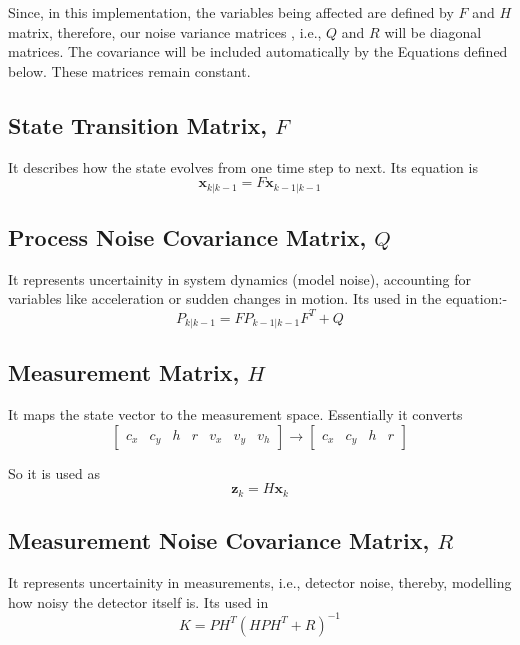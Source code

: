 \documentclass[10pt]{article}
\begin{document}
    \noindent Since, in this implementation, the variables being affected are defined by \(F\) and \(H\) matrix, therefore, our noise variance matrices , i.e., \(Q\) and \(R\) 
    will be diagonal matrices. The covariance will be included automatically by the Equations defined below. These matrices remain constant.

    \subsection{State Transition Matrix, \(F\)}
    It describes how the state evolves from one time step to next. Its equation is
    \begin{equation}
        \mathbf{x}_{k|k-1} = F\mathbf{x}_{k-1|k-1}
        \label{Eq:F_Matrix}
    \end{equation}

    \subsection{Process Noise Covariance Matrix, \(Q\)}
    It represents uncertainity in system dynamics (model noise), accounting for variables like acceleration or sudden changes in motion. Its used in the equation:-
    \begin{equation}
        P_{k|k-1}  = FP_{k-1|k-1}F^T + Q
        \label{Eq:Q_Matrix}
    \end{equation}

    \subsection{Measurement Matrix, \(H\)}
    It maps the state vector to the measurement space. Essentially it converts 
    \[
        \begin{bmatrix} c_x & c_y & h & r & v_x & v_y & v_h \end{bmatrix} \rightarrow \begin{bmatrix} c_x & c_y & h & r \end{bmatrix}
    \]

    So it is used as
    \begin{equation}
        \mathbf{z}_k = H\mathbf{x}_k
        \label{Eq:H_Matrix}
    \end{equation}

    \subsection{Measurement Noise Covariance Matrix, \(R\)}
    It represents uncertainity in measurements, i.e., detector noise, thereby, modelling how noisy the detector itself is. Its used in
    \begin{equation}
        K = PH^T(HPH^T + R)^{-1}
        \label{Eq:R_Matrix}
    \end{equation}
    
\end{document}
